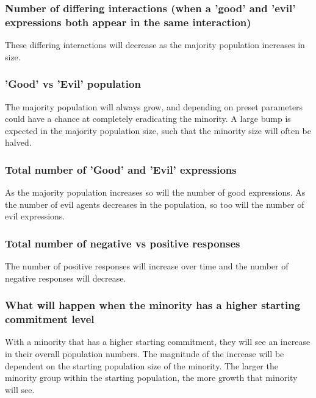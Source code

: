 \documentclass[]{article}
\begin{document}
\subsubsection{Number of differing interactions (when a 'good' and 'evil' expressions both appear in the same interaction)} These differing interactions will decrease as the majority population increases in size.


\subsubsection{'Good' vs 'Evil' population} The majority population will always grow, and depending on preset parameters could have a chance at completely eradicating the minority. A large bump is expected in the majority population size, such that the minority size will often be halved. 



\subsubsection{Total number of 'Good' and 'Evil' expressions} As the majority population increases so will the number of good expressions. As the number of evil agents decreases in the population, so too will the number of evil expressions.


\subsubsection{Total number of negative vs positive responses} The number of positive responses will increase over time and the number of negative responses will decrease.


\subsubsection{What will happen when the minority has a higher starting commitment level} With a minority that has a higher starting commitment, they will see an increase in their overall population numbers. The magnitude of the increase will be dependent on the starting population size of the minority. The larger the minority group within the starting population, the more growth that minority will see. 
\end{document}
